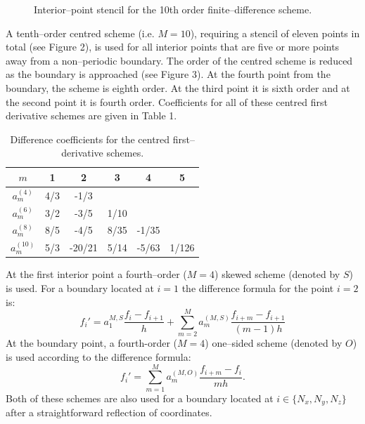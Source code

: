 \documentclass[dvips]{article}
\begin{document}
\begin{figure}[htbp]
\begin{center}
\caption{Interior--point stencil for the 10th order finite--difference scheme.}
\end{center}
\end{figure}

\noindent
A tenth--order centred scheme (i.e. $M=10$), requiring a stencil of eleven
points in total (see Figure 2), is used for all interior points that are five
or more points
away from a non--periodic boundary.  The order of the centred scheme is
reduced as the boundary is approached (see Figure 3).  At the fourth point
from the boundary,
the scheme is eighth order.  At the third point it is sixth order and at the
second point it is fourth order.  Coefficients for all of these centred
first derivative schemes are given in Table 1.

\begin{table}[htbp]
\begin{center}
\begin{tabular}{|c|c|c|c|c|c|} \hline
$m$            & 1   &  2     & 3    &  4    & 5     \\ \hline
$a_{m}^{(4)}$  & 4/3 & -1/3   &      &       &       \\
$a_{m}^{(6)}$  & 3/2 & -3/5   & 1/10 &       &       \\
$a_{m}^{(8)}$  & 8/5 & -4/5   & 8/35 & -1/35 &       \\
$a_{m}^{(10)}$ & 5/3 & -20/21 & 5/14 & -5/63 & 1/126 \\ \hline
\end{tabular}
\caption{Difference coefficients for the centred first--derivative schemes.}
\end{center}
\end{table}

At the first interior point a fourth--order ($M=4$) skewed scheme (denoted by
$S$) is used.  For a boundary located at $i=1$ the difference formula for the
point $i=2$ is:
\begin{equation}
f_{i}' = a_{1}^{M,S}\frac{f_{i} - f_{i+1}}{h}
       + \sum_{m=2}^{M} a_{m}^{(M,S)}\frac{f_{i+m} - f_{i+1}}{(m-1)h}
\label{FIRSTDERIVSKEW}
\end{equation}
At the boundary point, a fourth-order ($M=4$) one--sided scheme (denoted
by $O$) is used according to the difference formula:
\begin{equation}
f_{i}' = \sum_{m=1}^{M} a_{m}^{(M,O)}\frac{f_{i+m} - f_{i}}{mh}.
\label{FIRSTDERIVONESIDE}
\end{equation}
Both of these schemes are also used for a boundary located at
$i\in\{N_{x},N_{y},N_{z}\}$ after a straightforward reflection of coordinates.
\end{document}
